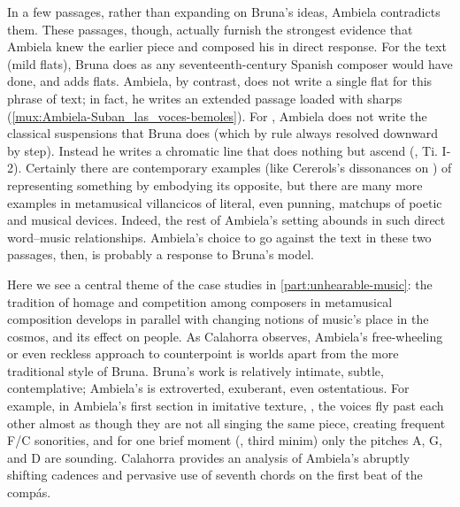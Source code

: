 In a few passages, rather than expanding on Bruna's ideas, Ambiela contradicts
them.
These passages, though, actually furnish the strongest evidence that Ambiela
knew the earlier piece and composed his in direct response.
For the text  (mild flats), Bruna does as any
seventeenth-century Spanish composer would have done, and adds flats.
Ambiela, by contrast, does not write a single flat for this phrase of text; in
fact, he writes an extended passage loaded with sharps
(\cref{mux:Ambiela-Suban_las_voces-bemoles}).
For , Ambiela does not write the classical
suspensions that Bruna does (which by rule always resolved downward by step).
Instead he writes a chromatic line that does nothing but ascend
(, Ti. I-2). 
Certainly there are contemporary examples (like Cererols's dissonances on
) of representing something by embodying its
opposite, but there are many more examples in metamusical villancicos of
literal, even punning, matchups of poetic and musical devices. 
Indeed, the rest of Ambiela's setting abounds in such direct word--music
relationships.
Ambiela's choice to go against the text in these two passages, then, is
probably a response to Bruna's model.


Here we see a central theme of the case studies in
\cref{part:unhearable-music}: the tradition of homage and competition among
composers in metamusical composition develops in parallel with changing notions
of music's place in the cosmos, and its effect on people.
As Calahorra observes, Ambiela's free-wheeling or even reckless approach to
counterpoint is worlds apart from the more traditional style of Bruna.
Bruna's work is relatively intimate, subtle, contemplative; Ambiela's is
extroverted, exuberant, even ostentatious.
For example, in Ambiela's first section in imitative texture, ,
the voices fly past each other almost as though they are not all singing the
same piece, creating frequent F\na{}/C\sh{} sonorities, and for one brief
moment (, third minim) only the pitches A, G, and D are sounding.
Calahorra provides an analysis of Ambiela's abruptly shifting cadences and
pervasive use of seventh chords on the first beat of the compás.

